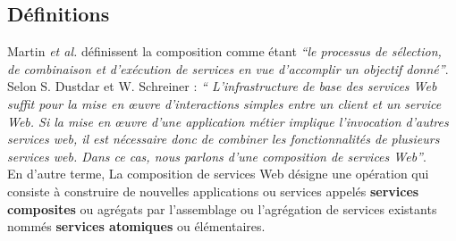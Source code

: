     \subsection{Définitions}
    \label{sec:definitions}

    Martin \emph{et al.} \cite{martin2004owl} définissent
    la composition comme étant \emph{``le processus de sélection, de
      combinaison et d'exécution de services en vue
      d'accomplir un objectif donné''}.\\

    Selon S. Dustdar et W. Schreiner \cite{dustdar2005survey} :
    \emph{`` L'infrastructure de base des services Web suffit pour la
      mise en œuvre d'interactions simples entre un client et un
      service Web. Si la mise en œuvre d'une application métier
      implique l'invocation d'autres services web, il est nécessaire
      donc de combiner les fonctionnalités de plusieurs services
      web. Dans ce cas, nous parlons d'une composition de services
      Web''}.\\

    En d'autre terme, La composition de services Web désigne une
    opération qui consiste à construire de nouvelles applications ou
    services appelés \textbf{services composites} ou agrégats par
    l'assemblage ou l'agrégation de services existants nommés
    \textbf{services atomiques} ou élémentaires.

    

